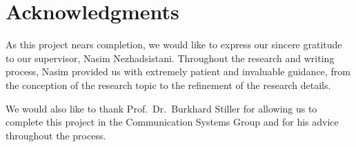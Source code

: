 \chapter*{Acknowledgments}

As this project nears completion, we would like to express our sincere gratitude to our supervisor, Nasim Nezhadsistani. Throughout the research and writing process, Nasim provided us with extremely patient and invaluable guidance, from the conception of the research topic to the refinement of the research details.

We would also like to thank Prof.~Dr.~Burkhard Stiller for allowing us to complete this project in the Communication Systems Group and for his advice throughout the process.